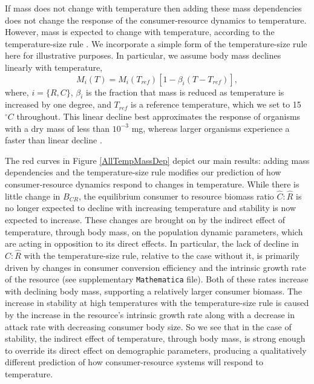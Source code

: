 \documentclass[11pt]{article}
\begin{document}
If mass does not change with temperature then adding these mass dependencies does not change the response of the consumer-resource dynamics to temperature.
However, mass is expected to change with temperature, according to the temperature-size rule \citep{Atkinson1994}.
We incorporate a simple form of the temperature-size rule here for illustrative purposes.
In particular, we assume body mass declines linearly with temperature, 
\[M_i(T) = M_i(T_{ref}) [1 - \beta_i (T - T_{ref})], \]
where, $i=\{R,C\}$, $\beta_i$ is the fraction that mass is reduced as temperature is increased by one degree, and $T_{ref}$ is a reference temperature, which we set to 15$^\circ C$ throughout.
This linear decline best approximates the response of organisms with a dry mass of less than $10^{-3}$ mg, whereas larger organisms experience a faster than linear decline \citep{Forster2012}.

The red curves in Figure \ref{AllTempMassDep} depict our main results: adding mass dependencies and the temperature-size rule modifies our prediction of how consumer-resource dynamics respond to changes in temperature.
While there is little change in $B_{CR}$, the equilibrium consumer to resource biomass ratio $\hat{C}:\hat{R}$ is no longer expected to decline with increasing temperature and stability is now expected to increase.
These changes are brought on by the indirect effect of temperature, through body mass, on the population dynamic parameters, which are acting in opposition to its direct effects.
In particular, the lack of decline in $\hat{C}:\hat{R}$ with the temperature-size rule, relative to the case without it, is primarily driven by changes in consumer conversion efficiency and the intrinsic growth rate of the resource (see supplementary \texttt{Mathematica} file).
Both of these rates increase with declining body mass, supporting a relatively larger consumer biomass. 
The increase in stability at high temperatures with the temperature-size rule is caused by the increase in the resource's intrinsic growth rate along with a decrease in attack rate with decreasing consumer body size. 
%
%
%
So we see that in the case of stability, the indirect effect of temperature, through body mass, is strong enough to override its direct effect on demographic parameters, producing a qualitatively different prediction of how consumer-resource systems will respond to temperature.
\end{document}
